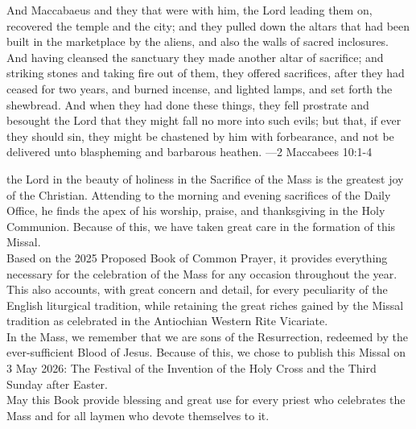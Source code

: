 {}
\par\noindent
\begin{quoting}
	And Maccabaeus and they that were with him, the Lord leading them on, recovered the temple and the city; and they pulled down the altars that had been built in the marketplace by the aliens, and also the walls of sacred inclosures. And having cleansed the sanctuary they made another altar of sacrifice; and striking stones and taking fire out of them, they offered sacrifices, after they had ceased for two years, and burned incense, and lighted lamps, and set forth the shewbread. And when they had done these things, they fell prostrate and besought the Lord that they might fall no more into such evils; but that, if ever they should sin, they might be chastened by him with forbearance, and not be delivered unto blaspheming and barbarous heathen. ---2 Maccabees 10:1-4
\end{quoting}

 the Lord in the beauty of holiness in the Sacrifice of the Mass is the greatest joy of the Christian. Attending to the morning and evening sacrifices of the Daily Office, he finds the apex of his worship, praise, and thanksgiving in the Holy Communion. Because of this, we have taken great care in the formation of this Missal.\\

Based on the 2025 Proposed Book of Common Prayer, it provides everything necessary for the celebration of the Mass for any occasion throughout the year. This also accounts, with great concern and detail, for every peculiarity of the English liturgical tradition, while retaining the great riches gained by the Missal tradition as celebrated in the Antiochian Western Rite Vicariate.\\

In the Mass, we remember that we are sons of the Resurrection, redeemed by the ever-sufficient Blood of Jesus. Because of this, we chose to publish this Missal on 3 May 2026: The Festival of the Invention of the Holy Cross and the Third Sunday after Easter.\\

May this Book provide blessing and great use for every priest who celebrates the Mass and for all laymen who devote themselves to it.\\


\vspace{1\baselineskip}


\vfill



